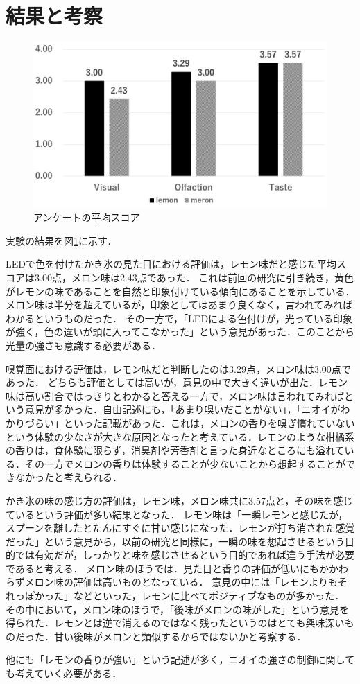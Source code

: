 
\section{結果と考察}

\begin{figure}[t]
  \includegraphics[width = 1.0\columnwidth]{figs/data.jpg}
  \caption{アンケートの平均スコア}
  \label{data}
\end{figure}
実験の結果を図\ref{data}に示す．


LEDで色を付けたかき氷の見た目における評価は，レモン味だと感じた平均スコアは3.00点，メロン味は2.43点であった．
これは前回の研究に引き続き，黄色がレモンの味であることを自然と印象付けている傾向にあることを示している．メロン味は半分を超えているが，印象としてはあまり良くなく，言われてみればわかるというものだった．
その一方で，「LEDによる色付けが，光っている印象が強く，色の違いが頭に入ってこなかった」という意見があった．このことから光量の強さも意識する必要がある．


嗅覚面における評価は，レモン味だと判断したのは3.29点，メロン味は3.00点であった．
どちらも評価としては高いが，意見の中で大きく違いが出た．レモン味は高い割合ではっきりとわかると答える一方で，メロン味は言われてみればという意見が多かった．自由記述にも，「あまり嗅いだことがない」，「ニオイがわかりづらい」といった記載があった．これは，メロンの香りを嗅ぎ慣れていないという体験の少なさが大きな原因となったと考えている．レモンのような柑橘系の香りは，食体験に限らず，消臭剤や芳香剤と言った身近なところにも溢れている．その一方でメロンの香りは体験することが少ないことから想起することができなかったと考えられる．


かき氷の味の感じ方の評価は，レモン味，メロン味共に3.57点と，その味を感じているという評価が多い結果となった．
レモン味は「一瞬レモンと感じたが，スプーンを離したとたんにすぐに甘い感じになった．レモンが打ち消された感覚だった」という意見から，以前の研究と同様に，一瞬の味を想起させるという目的では有効だが，しっかりと味を感じさせるという目的であれば違う手法が必要であると考える．
メロン味のほうでは．見た目と香りの評価が低いにもかかわらずメロン味の評価は高いものとなっている．
意見の中には「レモンよりもそれっぽかった」などといった，レモンに比べてポジティブなものが多かった．
その中において，メロン味のほうで，「後味がメロンの味がした」という意見を得られた．レモンとは逆で消えるのではなく残ったというのはとても興味深いものだった．甘い後味がメロンと類似するからではないかと考察する．

他にも「レモンの香りが強い」という記述が多く，ニオイの強さの制御に関しても考えていく必要がある．
